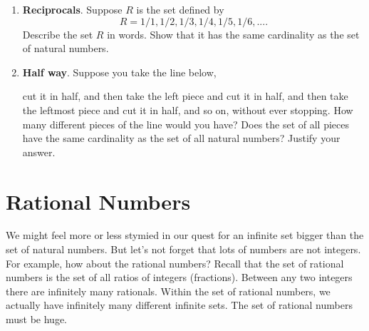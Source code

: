 \begin{enumerate}
\item \textbf{Reciprocals}. Suppose $R$ is the set defined by 
\[R = 1/1, 1/2, 1/3, 1/4, 1/5, 1/6, ... .\]
Describe the set $R$ in words. Show that it has the same cardinality as the set of natural numbers.

\vfill 

%

\item \textbf{Half way}. Suppose you take the line below,

\hrulefill

cut it in half, and then take the left piece and cut it in half, and then take the leftmost piece and cut it in half, and so on, without ever stopping. How many different pieces of the line would you have? Does the set of all pieces have the same cardinality as the set of all natural numbers? Justify your answer. \vfill
\end{enumerate}

\clearpage
\section{Rational Numbers}

We might feel more or less stymied in our quest for an infinite set bigger than the set of natural numbers. But let's not forget that lots of numbers are not integers. For example, how about the rational numbers? Recall that the set of rational numbers is the set of all ratios of integers (fractions). Between any two integers there are infinitely many rationals. Within the set of rational numbers, we actually have infinitely many different infinite sets. The set of rational numbers must be huge.

